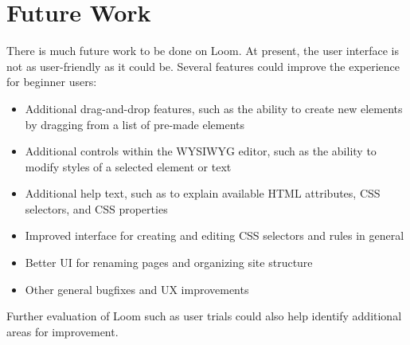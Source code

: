 \documentclass[conference, letterpaper]{IEEEtran}
\begin{document}
\section{Future Work}
There is much future work to be done on Loom. At present, the user interface is not as user-friendly as it could be. Several features could improve the experience for beginner users:
\begin{itemize}
  \item Additional drag-and-drop features, such as the ability to create new elements by dragging from a list of pre-made elements
  \item Additional controls within the WYSIWYG editor, such as the ability to modify styles of a selected element or text
  \item Additional help text, such as to explain available HTML attributes, CSS selectors, and CSS properties
  \item Improved interface for creating and editing CSS selectors and rules in general
  \item Better UI for renaming pages and organizing site structure
  \item Other general bugfixes and UX improvements
\end{itemize}

Further evaluation of Loom such as user trials could also help identify additional areas for improvement.

\medskip
\end{document}
